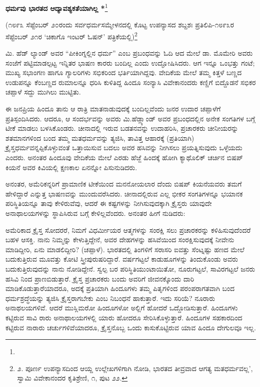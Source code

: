 \begin{center}
\textbf{ಧರ್ಮವು ಭಾರತದ ಆದ್ಯಾವಶ್ಯಕತೆಯಾಗಿಲ್ಲ *}\footnote{}
\end{center}

\begin{center}
(೧೮೯೩ ಸೆಪ್ಟೆಂಬರ್ ೨೦ರಂದು ಸರ್ವಧರ್ಮಸಮ್ಮೇಳನದಲ್ಲಿ ಕೊಟ್ಟ ಉಪನ್ಯಾಸದ ಶಬ್ದಶಃ ಪ್ರತಿಲಿಪಿ-೧೮೯೩ರ ಸೆಪ್ಟೆಂಬರ್ ೨೧ರ ‘ಚಿಕಾಗೊ ಇಂಟರ್ ಓಷನ್’ ಪತ್ರಿಕೆಯಲ್ಲಿ)\footnote{೨. ಪೂರ್ಣ ಉಪನ್ಯಾಸದಿಂದ ಆಯ್ದ ಉಲ್ಲೇಖಗಳಿಗಾಗಿ ನೋಡಿ, ಭಾರತದ ತೀವ್ರವಾದ ಆಗತ್ಯ ಮತಧರ್ಮವಲ್ಲ’, ಸ್ವಾಮಿ ವಿವೇಕಾನಂದರ ಕೃತಿಶ್ರೇಣಿ, ೧, ಪುಟ ೨೨.}
\end{center}

\begin{center}
\end{center}

ಮಿ. ಹೆಡ್ ಲ್ಯಾಂಡ್ ಅವರ “ಪೀಕಿಂಗ್ನಲ್ಲಿನ ಧರ್ಮ” ಎಂಬ ಪ್ರಬಂಧವನ್ನು ಓದಿ ಆದ ಮೇಲೆ ಡಾ. ಮೊಮೇರಿ ಅವರು ಸಂಜೆಗೆ ಪಟ್ಟಿಮಾಡಲ್ಪಟ್ಟ ಇನ್ನಿತರ ಭಾಷಣ ಕಾರರು ಬಂದಿಲ್ಲ ಎಂದು ಉದ್ಘೋಷಿಸಿದರು. ಆಗ ಇನ್ನೂ ಒಂಭತ್ತು ಗಂಟೆ; ಮುಖ್ಯ ಸಭಾಂಗಣ ಹಾಗೂ ಗ್ಯಾಲರಿಗಳು ಸಭಿಕರಿಂದ ಭರ್ತಿಯಾಗಿದ್ದವು. ವೇದಿಕೆಯ ಮೇಲೆ ತಮ್ಮ ಕಿತ್ತಳೆ ಬಣ್ಣದ ಉಡುಪನ್ನೂ ಕೆಂಬಣ್ಣದ ರುಮಾಲನ್ನೂ ಧರಿಸಿ ಕುಳಿತಿದ್ದ ಹಿಂದೂ ಸಂನ್ಯಾಸಿ ವಿವೇಕಾನಂದರು ಕಣ್ಣಿಗೆ ಬಿದ್ದೊಡನೆ ಸಭಿಕರ ಚಪ್ಪಾಳೆ ಸದ್ದು ಮುಗಿಲು ಮುಟ್ಟಿತು.

ಈ ಜನಪ್ರಿಯ ಹಿಂದೂ ತಾನು ಆ ರಾತ್ರಿ ಮಾತನಾಡುವುದಕ್ಕೆ ಬಂದಿಲ್ಲವೆಂದು ಜನರ ಉದಾರ ಚಪ್ಪಾಳೆಗೆ ಪ್ರತಿಸ್ಪಂದಿಸಿದರು. ಆದರೂ, ಆ ಸಂದರ್ಭವನ್ನು ಅವರು ಮಿ.ಹೆಡ್ಲ್ಯಾಂಡ್ ಅವರ ಪ್ರಬಂಧದಲ್ಲಿನ ಅನೇಕ ಸಂಗತಿಗಳ ಬಗ್ಗೆ ಟೀಕೆ ಮಾಡಲು ಬಳಸಿಕೊಂಡರು. ಚೀನಾದಲ್ಲಿ ಇರುವ ಬಡತನವನ್ನು ಉದಾಹರಿಸಿ, ಪ್ರಚಾರಕರು ಚೀನೀಯರನ್ನು ಶತಮಾನಗಳಿಂದ ಬಂದ ತಮ್ಮ ಮತಧರ್ಮವನ್ನು ತ್ಯಜಿಸಿ, ತಾವಿತ್ತ ಆಹಾರಕ್ಕೆ (ಪ್ರತಿಯಾಗಿ) ಕ್ರೈಸ್ತಧರ್ಮವನ್ನಪ್ಪಿಕೊಳ್ಳುವಂತೆ ಒತ್ತಾಯಿಸುವ ಬದಲು ಅವರ ಹಸಿವನ್ನು ನೀಗಿಸಲು ಪ್ರಯತ್ನಿಸುವುದು ಒಳ್ಳೆಯದು ಎಂದರು. ಅನಂತರ ಹಿಂದೂವು ವೇದಿಕೆಯ ಮೇಲೆ ಎರಡು ಹೆಜ್ಜೆ ಹಿಂದಕ್ಕೆ ಹೋಗಿ ಕ್ಯಾಥೊಲಿಕ್ ಚರ್ಚಿನ ಬಿಷಪ್ ಕಿಯನೆ ಅವರ ಕಿವಿಯಲ್ಲಿ ಕ್ಷಣಕಾಲ ಏನನ್ನೋ ಪಿಸುನುಡಿದರು.

ಅನಂತರ, ಅಮೆರಿಕನ್ನರಿಗೆ ಪ್ರಾಮಾಣಿಕ ಟೀಕೆಯಿಂದ ಮನನೋಯಲಾರ ದೆಂದು ಬಿಷಪ್ ಕಿಯನೆಯವರು ತಮಗೆ ಹೇಳಿದ್ದಾರೆ ಎನ್ನುತ್ತ ಭಾಷಣವನ್ನು ಮುಂದುವರೆಸಿದರು. ಚೀನಾದಲ್ಲಿರುವ ಎಲ್ಲ ಭೀಕರ ಸಂಗತಿಗಳನ್ನೂ ಭಯಾನಕ ಪರಿಸ್ಥಿತಿಯನ್ನೂ ತಾವು ಕೇಳಿರುವೆವು, ಆದರೆ ಈ ಕಷ್ಟಗಳನ್ನು ನೀಗಿಸುವುದಕ್ಕಾಗಿ ಕ್ರೈಸ್ತರು ಯಾವುದೇ ಅನಾಥಾಲಯಗಳನ್ನು ಸ್ಥಾಪಿಸಿರುವ ಬಗ್ಗೆ ಕೇಳಿಲ್ಲವೆಂದರು. ಅನಂತರ ಹೀಗೆ ನುಡಿದರು:

ಅಮೆರಿಕಾದ ಕ್ರೈಸ್ತ ಸೋದರರೆ, ನಿಮಗೆ ವಿಧರ್ಮೀಯರ ಆತ್ಮಗಳನ್ನು ಸಂರಕ್ಷಿ ಸಲು ಪ್ರಚಾರಕರನ್ನು ಕಳಿಹಿಸುವುದೆಂದರೆ ಬಹಳ ಆಸಕ್ತಿ. ನಾನು ನಿಮ್ಮನ್ನು ಕೇಳುತ್ತಿದ್ದೇನೆ, ಅವರ ದೇಹಗಳನ್ನು ಹಸಿವೆಯಿಂದ ಸಂರಕ್ಷಿಸುವುದಕ್ಕೆ ನೀವೇನು ಮಾಡಿದ್ದೀರಿ, ಏನು ಮಾಡಲಿದ್ದೀರಿ? (ಚಪ್ಪಾಳೆ). ಭಾರತದಲ್ಲಿ ತಿಂಗಳಿಗೆ ಸರಾಸರಿ ಐವತ್ತು ಸೆಂಟ್ನಷ್ಟು ಹಣದ ಮೇಲೆ ಬದುಕುತ್ತಿರುವ ಮೂವತ್ತು ಕೋಟಿ ಸ್ತ್ರೀಪುರುಷರಿದ್ದಾರೆ. ವರ್ಷಗಟ್ಟಲೆ ಕಾಡುಹೂಗಳನ್ನು ತಿಂದುಕೊಂಡು ಅವರು ಬದುಕುತ್ತಿರುವುದನ್ನು ನಾನು ನೋಡಿದ್ದೇನೆ. ಸ್ವಲ್ಪ ಬರ ಪರಿಸ್ಥಿತಿಯುಂಟಾಯಿತೋ, ನೂರುಗಟ್ಟಲೆ, ಸಾವಿರಗಟ್ಟಲೆ ಜನರು ಹಸಿವಿ ನಿಂದ ಪ್ರಾಣಬಿಡುತ್ತಾರೆ. ಕ್ರೈಸ್ತ ಪ್ರಚಾರಕರು ಬಂದು ಅವರಿಗೆ ಜೀವನಕ್ಕೊಂದು ದಾರಿ ಮಾಡಿಕೊಡುತ್ತಾರೆಯಾದರೂ, ಅದಕ್ಕೆ ಪ್ರತಿಯಾಗಿ ಹಿಂದೂಗಳು ತಮ್ಮ ಪಿತೃಗಳಿಂದ ಪರಂಪರಾಗತವಾಗಿ ಬಂದ ಧರ್ಮಶ್ರದ್ಧೆಯನ್ನು ತ್ಯಜಿಸಿ ಕ್ರೈಸ್ತರಾಗಬೇಕು ಎಂಬ ನಿಬಂಧನೆ ಹಾಕುತ್ತಾರೆ. ಇದು ಸರಿಯೆ? ನೂರಾರು ಅನಾಥಲಯಗಳಿವೆ. ಆದರೆ ಮುಸ್ಲಿಮರೋ ಹಿಂದೂಗಳೋ ಅಲ್ಲಿಗೆ ಹೋದರೆ ಒದ್ದೋಡಿಸುತ್ತಾರೆ. ಹಿಂದೂಗಳು ಕಟ್ಟಿರುವ ಸಾವಿ ರಾರು ಅನಾಥಾಲಯಗಳಲ್ಲಿ ಯಾರು ಹೋದರೂ ಸೇರಿಸಿಕೊಳ್ಳುತ್ತಾರೆ. ಹಿಂದೂಗಳ ಸಹಕಾರದಿಂದ ಕಟ್ಟಿರುವ ನಾರಾರು ಚರ್ಚುಗಳಿವೆಯಾದರೂ, ಕ್ರೈಸ್ತನೊಬ್ಬ ಒಂದು ಕಾಸುಕೊಟ್ಟಿರುವ ಯಾವ ಹಿಂದೂ ದೇಗುಲವೂ ಇಲ್ಲ.

